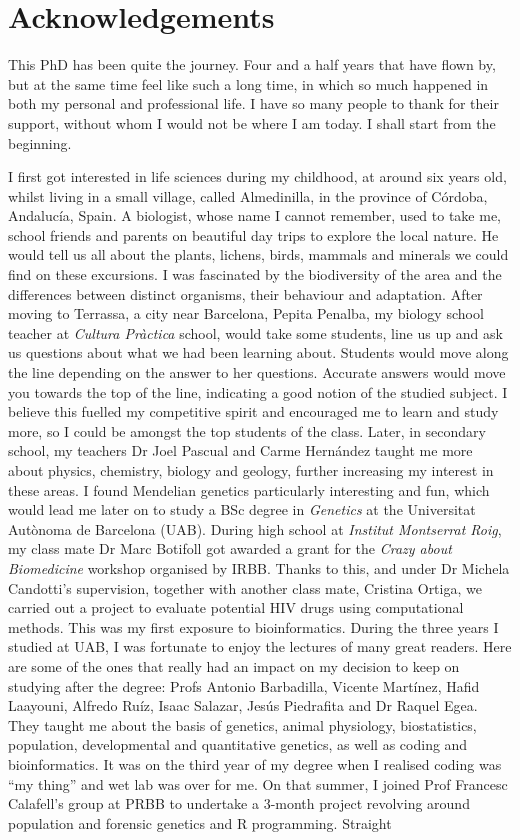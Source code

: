 \chapter*{Acknowledgements} %

This PhD has been quite the journey. Four and a half years that have flown by, but at the same time feel like such a long time, in which so much happened in both my personal and professional life. I have so many people to thank for their support, without whom I would not be where I am today. I shall start from the beginning.

I first got interested in life sciences during my childhood, at around six years old, whilst living in a small village, called Almedinilla, in the province of Córdoba, Andalucía, Spain. A biologist, whose name I cannot remember, used to take me, school friends and parents on beautiful day trips to explore the local nature. He would tell us all about the plants, lichens, birds, mammals and minerals we could find on these excursions. I was fascinated by the biodiversity of the area and the differences between distinct organisms, their behaviour and adaptation. After moving to Terrassa, a city near Barcelona, Pepita Penalba, my biology school teacher at \textit{Cultura Pràctica} school, would take some students, line us up and ask us questions about what we had been learning about. Students would move along the line depending on the answer to her questions. Accurate answers would move you towards the top of the line, indicating a good notion of the studied subject. I believe this fuelled my competitive spirit and encouraged me to learn and study more, so I could be amongst the top students of the class. Later, in secondary school, my teachers Dr Joel Pascual and Carme Hernández taught me more about physics, chemistry, biology and geology, further increasing my interest in these areas. I found Mendelian genetics particularly interesting and fun, which would lead me later on to study a BSc degree in \textit{Genetics} at the Universitat Autònoma de Barcelona (UAB). During high school at \textit{Institut Montserrat Roig}, my class mate Dr Marc Botifoll got awarded a grant for the \textit{Crazy about Biomedicine} workshop organised by IRBB. Thanks to this, and under Dr Michela Candotti's supervision, together with another class mate, Cristina Ortiga, we carried out a project to evaluate potential HIV drugs using computational methods. This was my first exposure to bioinformatics. During the three years I studied at UAB, I was fortunate to enjoy the lectures of many great readers. Here are some of the ones that really had an impact on my decision to keep on studying after the degree: Profs Antonio Barbadilla, Vicente Martínez, Hafid Laayouni, Alfredo Ruíz, Isaac Salazar, Jesús Piedrafita and Dr Raquel Egea. They taught me about the basis of genetics, animal physiology, biostatistics, population, developmental and quantitative genetics, as well as coding and bioinformatics. It was on the third year of my degree when I realised coding was ``my thing'' and wet lab was over for me. On that summer, I joined Prof Francesc Calafell's group at PRBB to undertake a 3-month project revolving around population and forensic genetics and R programming. Straight 